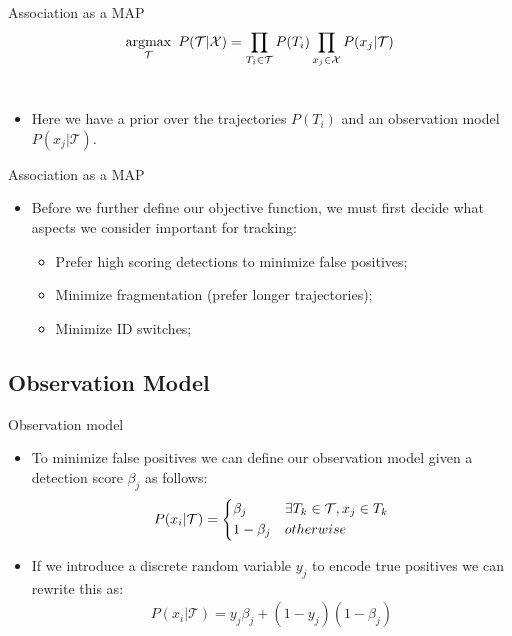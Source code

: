 \begin{frame}{Association as a MAP}
	\begin{gather*}
		\operatorname*{argmax}_\mathcal{T}\  P(\mathcal{T}|\mathcal{X}) = \prod_{T_i \in \mathcal{T}}  P(T_i) \prod_{x_j \in \mathcal{X}} P(x_{j}|\mathcal{T}) \\
	\end{gather*}\\[-2ex]
	\begin{itemize}
		\item Here we have a prior over the trajectories $P(T_i)$ and an observation model $P(x_{j}|\mathcal{T})$.
	\end{itemize}
\end{frame}


\begin{frame}{Association as a MAP}
	\begin{itemize}
		\item Before we further define our objective function, we must first decide what aspects we consider important for tracking:
		\begin{itemize}
			\item Prefer high scoring detections to minimize false positives;
			\item Minimize fragmentation (prefer longer trajectories);
			\item Minimize ID switches;
		\end{itemize}
	\end{itemize}
\end{frame}

\subsection{Observation Model}
\begin{frame}{Observation model}
	\begin{itemize}
		\item To minimize false positives we can define our observation model given a detection score $\beta_j$ as follows:
		\begin{gather*}
			P(x_i|\mathcal{T}) = \begin{dcases} \beta_j & \exists T_k \in \mathcal{T}, x_j \in T_k\\1-\beta_j & otherwise\end{dcases}
		\end{gather*}
		\item If we introduce a discrete random variable $y_j$ to encode true positives we can rewrite this as:
		\begin{gather*}
			P(x_i|\mathcal{T}) = y_j \beta_j + (1-y_j)(1-\beta_j)
		\end{gather*}
	\end{itemize}
\end{frame}

